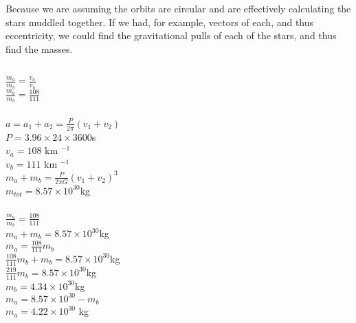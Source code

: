 \documentclass{article}
\begin{document}
\subsubsection{}
    \begin{center}
        Because we are assuming the orbits are circular and are effectively calculating the stars muddled together. If we had, for example, vectors of each, and thus eccentricity, we could find the gravitational pulls of each of the stars, and thus find the masses.
    \end{center}

\subsection{}
\subsubsection{}

\begin{center}
        \(\frac{m_a}{m_b} = \frac{v_a}{v_b}\)\\
        \(\frac{m_a}{m_b} = \frac{108}{111}\)
\end{center}

\subsubsection{}

\begin{center}
    \(a = a_1 + a_2 = \frac{P}{2\pi}(v_1 + v_2)\)\\
    \(P = 3.96 \times 24 \times 3600\)s \\
    \(v_a = 108 \) km \(^{-1}\)\\
    \(v_b = 111 \) km \(^{-1}\)\\
    \vspace{6mm}
    \(m_a + m_b = \frac{P}{2\pi G} (v_1 + v_2)^3 \)\\
    \(m_{tot} = 8.57 \times 10^{30}\)kg
\end{center}


\subsubsection{}
\begin{center}
    \(\frac{m_a}{m_b} = \frac{108}{111}\)\\
    \(m_a + m_b = 8.57 \times 10^{30}\)kg \\
    \(m_a = \frac{108}{111}m_b \)\\
    \(\frac{108}{111}m_b +m_b = 8.57 \times 10^{30}\)kg \\
    \(\frac{219}{111}m_b = 8.57 \times 10^{30}\)kg \\
    \(m_b = 4.34 \times 10^{30}\)kg\\
    \(m_a = 8.57 \times 10^{30} - m_b\)\\
    \(m_a = 4.22 \times 10^{30}\) kg




\end{center}
\end{document}
